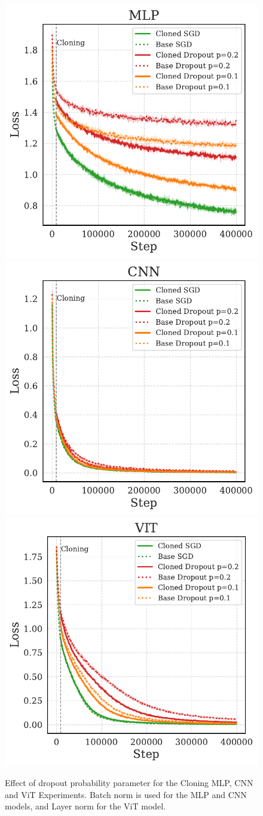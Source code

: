 \documentclass{article}
\numberwithin{figure}{section}
\begin{document}
\begin{figure}
    \centering
    \includegraphics[width=0.3\linewidth]{paper/images/mlp_dropout_cloning_losses_plot.pdf}
    \includegraphics[width=0.3\linewidth]{paper/images/cnn_dropout_cloning_losses_plot.pdf}
    \includegraphics[width=0.3\linewidth]{paper/images/vit_dropout_cloning_losses_plot.pdf}
    \caption{Effect of dropout probability parameter for the Cloning MLP, CNN and ViT Experiments. Batch norm is used for the MLP and CNN models, and Layer norm for the ViT model.}
    \label{fig:cloning-dropout}
\end{figure}
\end{document}
